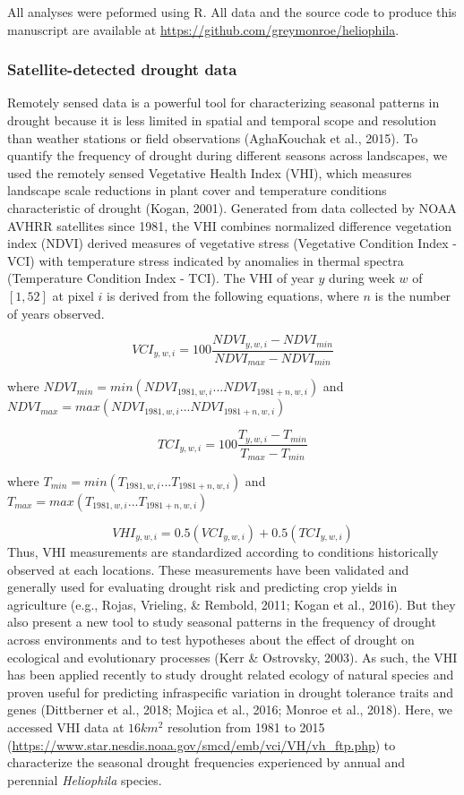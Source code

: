 \documentclass[man,floatsintext]{apa6}
\theoremstyle{definition}
\theoremstyle{definition}
\theoremstyle{definition}
\theoremstyle{remark}
\begin{document}
All analyses were peformed using R. All data and the source code to
produce this manuscript are available at
\url{https://github.com/greymonroe/heliophila}.

\hypertarget{satellite-detected-drought-data}{%
\subsubsection{Satellite-detected drought
data}\label{satellite-detected-drought-data}}

Remotely sensed data is a powerful tool for characterizing seasonal
patterns in drought because it is less limited in spatial and temporal
scope and resolution than weather stations or field observations
(AghaKouchak et al., 2015). To quantify the frequency of drought during
different seasons across landscapes, we used the remotely sensed
Vegetative Health Index (VHI), which measures landscape scale reductions
in plant cover and temperature conditions characteristic of drought
(Kogan, 2001). Generated from data collected by NOAA AVHRR satellites
since 1981, the VHI combines normalized difference vegetation index
(NDVI) derived measures of vegetative stress (Vegetative Condition Index
- VCI) with temperature stress indicated by anomalies in thermal spectra
(Temperature Condition Index - TCI). The VHI of year \(y\) during week
\(w\) of \([1,52]\) at pixel \(i\) is derived from the following
equations, where \(n\) is the number of years observed.

\[VCI_{y,w,i} = 100\frac{NDVI_{y,w,i} - NDVI_{min}}{NDVI_{max} - NDVI_{min}}\]

where \(NDVI_{min} = min(NDVI_{1981,w,i}...NDVI_{1981+n,w,i})\) and
\(NDVI_{max} = max(NDVI_{1981,w,i}...NDVI_{1981+n,w,i})\)

\[TCI_{y,w,i} = 100\frac{T_{y,w,i} - T_{min}}{T_{max} - T_{min}}\]

where \(T_{min} = min(T_{1981,w,i}...T_{1981+n,w,i})\) and
\(T_{max} = max(T_{1981,w,i}...T_{1981+n,w,i})\)

\[VHI_{y,w,i} = 0.5(VCI_{y,w,i}) + 0.5(TCI_{y,w,i})\] Thus, VHI
measurements are standardized according to conditions historically
observed at each locations. These measurements have been validated and
generally used for evaluating drought risk and predicting crop yields in
agriculture (e.g., Rojas, Vrieling, \& Rembold, 2011; Kogan et al.,
2016). But they also present a new tool to study seasonal patterns in
the frequency of drought across environments and to test hypotheses
about the effect of drought on ecological and evolutionary processes
(Kerr \& Ostrovsky, 2003). As such, the VHI has been applied recently to
study drought related ecology of natural species and proven useful for
predicting infraspecific variation in drought tolerance traits and genes
(Dittberner et al., 2018; Mojica et al., 2016; Monroe et al., 2018).
Here, we accessed VHI data at \(16km^2\) resolution from 1981 to 2015
(\url{https://www.star.nesdis.noaa.gov/smcd/emb/vci/VH/vh_ftp.php}) to
characterize the seasonal drought frequencies experienced by annual and
perennial \emph{Heliophila} species.
\end{document}
